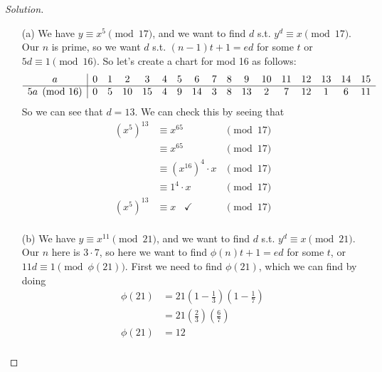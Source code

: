 \documentclass[11pt]{article}
\newenvironment{solution}
  {\renewcommand\qedsymbol{$~$}\begin{proof}[Solution]$ $\par\nobreak\ignorespaces}
  {\end{proof}}
\begin{document}
\begin{solution}
  \begin{itemize}
    \item [(a)] We have $y \equiv x^5 \pmod{17}$, and we want to find $d$ s.t. $y^{d} \equiv x \pmod{17}$. Our $n$ is prime, so we want $d$ s.t. $(n-1)t + 1 = ed$ for some $t$ or $5d \equiv 1 \pmod{16}$.
          So let's create a chart for mod 16 as follows:
          \[\begin{array}{c| *{16}{c}}
              a            & 0 & 1 & 2  & 3  & 4 & 5 & 6  & 7 & 8 & 9  & 10 & 11 & 12 & 13 & 14 & 15 \\
              \hline
              5a \pmod{16} & 0 & 5 & 10 & 15 & 4 & 9 & 14 & 3 & 8 & 13 & 2  & 7  & 12 & 1  & 6  & 11 \\
            \end{array}\]
          So we can see that $d=13$. We can check this by seeing that
          \begin{align*}
            (x^5)^{13} & \equiv x^{65}               & \pmod{17} \\
                       & \equiv x^{65}               & \pmod{17} \\
                       & \equiv (x^{16})^{4} \cdot x & \pmod{17} \\
                       & \equiv 1^4 \cdot x          & \pmod{17} \\
            (x^5)^{13} & \equiv x  \;\;\; \checkmark & \pmod{17} \\
          \end{align*}






    \item [(b)] We have $y \equiv x^{11} \pmod{21}$, and we want to find $d$ s.t. $y^{d} \equiv x \pmod{21}$. Our $n$ here is $3\cdot 7$, so here we want to find $\phi(n)t+1 = ed$ for some $t$, or $11d \equiv 1 \pmod{\phi(21)}$. First we need to find $\phi(21)$, which we can find by doing
          \begin{align*}
            \phi(21) & = 21 \left(1-\frac{1}{3}\right)\left(1-\frac{1}{7}\right) \\
                     & = 21 \left(\frac{2}{3}\right)\left(\frac{6}{7}\right)     \\
            \phi(21) & = 12                                                      \\
          \end{align*}


\end{itemize}
\end{solution}
\end{document}
